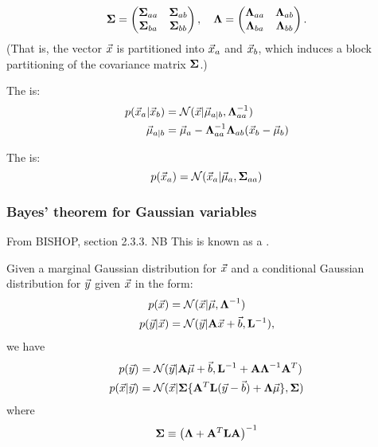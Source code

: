 \documentclass[11pt]{article}
\begin{document}
\begin{appendices}
\begin{equation}
  \boldsymbol{\Sigma} =
  \left(
    \begin{matrix}
      \boldsymbol{\Sigma}_{aa} & \boldsymbol{\Sigma}_{ab} \\
      \boldsymbol{\Sigma}_{ba} & \boldsymbol{\Sigma}_{bb}
    \end{matrix}
  \right)
  , \quad
  \boldsymbol{\Lambda} =
  \left(
    \begin{matrix}
      \boldsymbol{\Lambda}_{aa} & \boldsymbol{\Lambda}_{ab} \\
      \boldsymbol{\Lambda}_{ba} & \boldsymbol{\Lambda}_{bb}
    \end{matrix}
  \right).
\end{equation}
(That is, the vector $\vec{x}$ is partitioned into $\vec{x}_a$ and $\vec{x}_b$, which
induces a block partitioning of the covariance matrix $\boldsymbol{\Sigma}$.)

The  is:
\begin{align}
  p(\vec{x}_a | \vec{x}_b) &= \mathcal{N}(\vec{x} | \vec{\mu}_{a | b},
                         \boldsymbol{\Lambda}_{aa}^{-1}) \\ 
  \vec{\mu}_{a | b}      &= \vec{\mu}_a - \boldsymbol{\Lambda}_{aa}^{-1} \boldsymbol{\Lambda}_{ab}
                         (\vec{x}_b - \vec{\mu}_b)   \label{eq:gauss_part_cond} 
\end{align}

The  is:
\begin{equation}
  p(\vec{x}_a) = \mathcal{N}(\vec{x}_a | \vec{\mu}_a, \boldsymbol{\Sigma}_{aa}) \label{eq:gauss_part_marg} 
\end{equation}

\subsubsection{Bayes' theorem for Gaussian variables}
From BISHOP, section 2.3.3. NB This is known as a .

Given a marginal Gaussian distribution for $\vec{x}$ and a conditional Gaussian
distribution for $\vec{y}$ given $\vec{x}$ in the form:
\begin{align}
  p(\vec{x})       &= \mathcal{N}(\vec{x} | \vec{\mu}, \boldsymbol{\Lambda}^{-1}) \\
  p(\vec{y}|\vec{x}) &= \mathcal{N}(\vec{y} | \mathbf{A} \vec{x} + \vec{b}, \mathbf{L}^{-1}),
\end{align}
we have
\begin{align}
  p(\vec{y})       &= \mathcal{N} (\vec{y} |\mathbf{A} \vec{\mu} + \vec{b}, \mathbf{L}^{-1}
                   + \mathbf{A} \boldsymbol{\Lambda}^{-1} \mathbf{A}^T )   \label{eq:gauss_bayes_marg} \\
  p(\vec{x}|\vec{y}) &= \mathcal{N} ( \vec{x} | \boldsymbol{\Sigma} \{ \mathbf{A}^T \mathbf{L}
                   (\vec{y} - \vec{b}) + \boldsymbol{\Lambda} \vec{\mu} \},
                   \boldsymbol{\Sigma})   \label{eq:gauss_bayes_cond} 
\end{align}
where
\begin{equation}
  \boldsymbol{\Sigma} \equiv \left(\boldsymbol{\Lambda} + \mathbf{A}^T \mathbf{L} \mathbf{A} \right)^{-1}
\end{equation}



\end{appendices}
\end{document}

